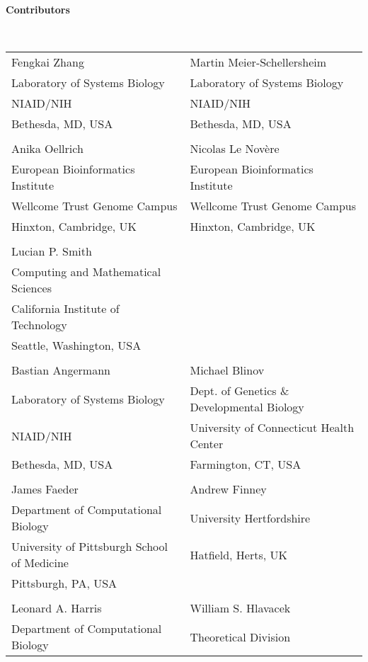 
\begin{large}\textbf{Contributors}\end{large} \\
\begin{center}
  \begin{tabular}{l @{\hspace{20 pt}} l}
  Fengkai Zhang 			& Martin Meier-Schellersheim \\[0.25em]
  Laboratory of Systems Biology		& Laboratory of Systems Biology \\
  NIAID/NIH				& NIAID/NIH \\
  Bethesda, MD, USA			& Bethesda, MD, USA \\
  \\
  Anika Oellrich			& Nicolas Le Nov\`ere \\[0.25em]
  European Bioinformatics Institute	& European Bioinformatics Institute \\
  Wellcome Trust Genome Campus		& Wellcome Trust Genome Campus \\
  Hinxton, Cambridge, UK	& Hinxton, Cambridge, UK \\
  \\
  Lucian P. Smith 			& \\[0.25em]
  Computing and Mathematical Sciences	& \\
  California Institute of Technology	& \\
  Seattle, Washington, USA		& \\
  \\
  Bastian Angermann			& Michael Blinov \\[0.25em]
  Laboratory of Systems Biology		& Dept. of Genetics \& Developmental Biology \\
  NIAID/NIH				& University of Connecticut Health Center \\
  Bethesda, MD, USA			& Farmington, CT, USA \\
  \\
  James Faeder 				& Andrew Finney \\[0.25em]
  Department of Computational Biology	& University Hertfordshire \\
  University of Pittsburgh School of Medicine	& Hatfield, Herts, UK \\
  Pittsburgh, PA, USA			&  \\
  \\
  Leonard A. Harris 			& William S. Hlavacek \\[0.25em]
  Department of Computational Biology	& Theoretical Division \\

\end{tabular}
\end{center}
